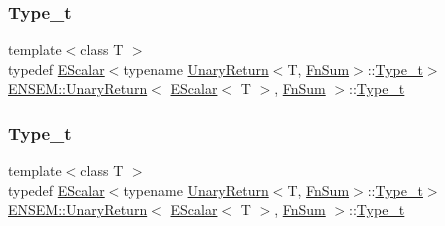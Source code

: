 \subsubsection{\texorpdfstring{Type\_t}{Type\_t}\hspace{0.1cm}{\footnotesize\ttfamily [1/3]}}
{\footnotesize\ttfamily template$<$class T $>$ \\
typedef \mbox{\hyperlink{classENSEM_1_1EScalar}{E\+Scalar}}$<$typename \mbox{\hyperlink{structENSEM_1_1UnaryReturn}{Unary\+Return}}$<$T, \mbox{\hyperlink{structENSEM_1_1FnSum}{Fn\+Sum}}$>$\+::\mbox{\hyperlink{structENSEM_1_1UnaryReturn_3_01EScalar_3_01T_01_4_00_01FnSum_01_4_af4e59c889efbb46ce21a3b03bb7c9b9e}{Type\+\_\+t}}$>$ \mbox{\hyperlink{structENSEM_1_1UnaryReturn}{E\+N\+S\+E\+M\+::\+Unary\+Return}}$<$ \mbox{\hyperlink{classENSEM_1_1EScalar}{E\+Scalar}}$<$ T $>$, \mbox{\hyperlink{structENSEM_1_1FnSum}{Fn\+Sum}} $>$\+::\mbox{\hyperlink{structENSEM_1_1UnaryReturn_3_01EScalar_3_01T_01_4_00_01FnSum_01_4_af4e59c889efbb46ce21a3b03bb7c9b9e}{Type\+\_\+t}}}

\mbox{\label{structENSEM_1_1UnaryReturn_3_01EScalar_3_01T_01_4_00_01FnSum_01_4_af4e59c889efbb46ce21a3b03bb7c9b9e}} 
\subsubsection{\texorpdfstring{Type\_t}{Type\_t}\hspace{0.1cm}{\footnotesize\ttfamily [2/3]}}
{\footnotesize\ttfamily template$<$class T $>$ \\
typedef \mbox{\hyperlink{classENSEM_1_1EScalar}{E\+Scalar}}$<$typename \mbox{\hyperlink{structENSEM_1_1UnaryReturn}{Unary\+Return}}$<$T, \mbox{\hyperlink{structENSEM_1_1FnSum}{Fn\+Sum}}$>$\+::\mbox{\hyperlink{structENSEM_1_1UnaryReturn_3_01EScalar_3_01T_01_4_00_01FnSum_01_4_af4e59c889efbb46ce21a3b03bb7c9b9e}{Type\+\_\+t}}$>$ \mbox{\hyperlink{structENSEM_1_1UnaryReturn}{E\+N\+S\+E\+M\+::\+Unary\+Return}}$<$ \mbox{\hyperlink{classENSEM_1_1EScalar}{E\+Scalar}}$<$ T $>$, \mbox{\hyperlink{structENSEM_1_1FnSum}{Fn\+Sum}} $>$\+::\mbox{\hyperlink{structENSEM_1_1UnaryReturn_3_01EScalar_3_01T_01_4_00_01FnSum_01_4_af4e59c889efbb46ce21a3b03bb7c9b9e}{Type\+\_\+t}}}


